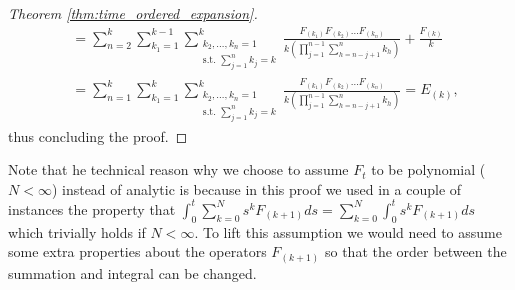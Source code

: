 \begin{proof}[Theorem \ref{thm:time_ordered_expansion}]
\begin{align*}
        &= \sum_{n=2}^{k} \sum_{k_1=1}^{k-1} \sum_{\substack{{k_2,\dots,k_{n} = 1}\\{\text{s.t. }\sum_{j=1}^{n}k_{j}=k}}}^{k} \frac{F_{(k_1)} F_{(k_2)}\dots F_{(k_{n})}}{k(\prod_{j=1}^{n-1} \sum_{h=n-j+1}^{n} k_{h})}+\frac{F_{(k)}}{k}\\
        &= \sum_{n=1}^{k} \sum_{k_1=1}^{k} \sum_{\substack{{k_2,\dots,k_{n} = 1}\\{\text{s.t. }\sum_{j=1}^{n}k_{j}=k}}}^{k} \frac{F_{(k_1)} F_{(k_2)}\dots F_{(k_{n})}}{k(\prod_{j=1}^{n-1} \sum_{h=n-j+1}^{n} k_{h})} = E_{(k)},
    \end{align*}    
    thus concluding the proof.
\end{proof}

Note that he technical reason why we choose to assume $F_t$ to be polynomial ($N<\infty$) instead of analytic is because in this proof we used in a couple of instances the property that $\int_0^t \sum_{k=0}^N s^k F_{(k+1)} ds = \sum_{k=0}^N \int_0^t s^k F_{(k+1)} ds $ which trivially holds if $N<\infty$. To lift this assumption we would need to assume some extra properties about the operators $F_{(k+1)}$ so that the order between the summation and integral can be changed.

